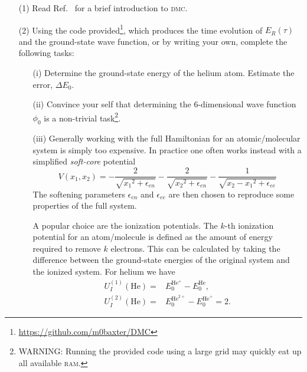 \documentclass[letterpaper, 11 pt]{article}
\begin{document}
\begin{itemize}

   \item[(1)] Read Ref.~\cite{dmc} for a brief introduction to \textsc{dmc}.

   \item[(2)] Using the code provided\footnote{\href{https://github.com/m0baxter/DMC}
      {https://github.com/m0baxter/DMC}}, which produces the time evolution of $E_R(\tau)$ and the
      ground-state wave function, or by writing your own, complete the following tasks:

      \begin{itemize}

         \item[(i)] Determine the ground-state energy of the helium atom. Estimate the error,
            $\Delta E_0$.

         \item[(ii)] Convince your self that determining the 6-dimensional wave function $\phi_0$
            is a non-trivial task\footnote{WARNING: Running the provided code using a large grid
            may quickly eat up all available \textsc{ram}.}.

         \item[(iii)] Generally working with the full Hamiltonian for an atomic/molecular system is
            simply too expensive. In practice one often works instead with a simplified \emph{soft-core}
            potential
            \begin{equation}
               V(x_1, x_2) = -\frac{2}{\sqrt{{x_1}^2 + \epsilon_{en}}}
                             -\frac{2}{\sqrt{{x_2}^2 + \epsilon_{en}}}
                             -\frac{1}{\sqrt{{x_2 - x_1}^2 + \epsilon_{ee}}}
            \end{equation}
            The softening parameters $\epsilon_{en}$ and $\epsilon_{ee}$ are then chosen to reproduce
            some properties of the full system.

            A popular choice are the ionization potentials. The $k$-th ionization potential for an
            atom/molecule is defined as the amount of energy required to remove $k$ electrons. This can
            be calculated by taking the difference between the ground-state energies of the original
            system and the ionized system. For helium we have
            \begin{align}
               U_I^{(1)}(\mathrm{He}) = & E_0^{\mathrm{He}^+} - E_0^{\mathrm{He}}, \\
               U_I^{(2)}(\mathrm{He}) = & E_0^{\mathrm{He}^{2+}} - E_0^{\mathrm{He}^+} = 2.
            \end{align}


\end{itemize}
\end{itemize}
\end{document}
